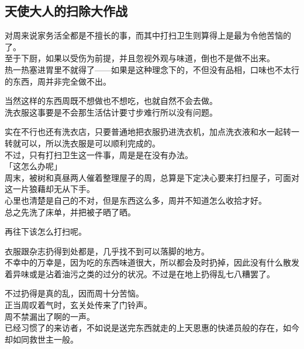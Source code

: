 \subsection{天使大人的扫除大作战}

对周来说家务活全都是不擅长的事，而其中打扫卫生则算得上是最为令他苦恼的了。\\

至于下厨，如果以受伤为前提，并且忽视外观与味道，倒也不是做不出来。\\

热一热塞进胃里不就得了——如果是这种理念下的，不但没有品相，口味也不太行的东西，周并非完全做不出。

当然这样的东西周既不想做也不想吃，也就自然不会去做。\\

洗衣服这事要是不会那生活估计要寸步难行所以没有问题。

实在不行也还有洗衣店，只要普通地把衣服扔进洗衣机，加点洗衣液和水一起转一转就可以，所以洗衣服是可以顺利完成的。\\

不过，只有打扫卫生这一件事，周是是在没有办法。\\

「这怎么办呢」\\

周末，被树和真昼两人催着整理屋子的周，总算是下定决心要来打扫屋子，可面对这一片狼藉却无从下手。\\

心里也清楚是自己的不对，但是东西这么多，周并不知道怎么收拾才好。\\

总之先洗了床单，并把被子晒了晒。

再往下该怎么打扫呢。

衣服跟杂志扔得到处都是，几乎找不到可以落脚的地方。\\

不幸中的万幸是，因为吃的东西味道很大，所以都会及时扔掉，因此没有什么散发着异味或是沾着油污之类的过分的状况。不过是在地上扔得乱七八糟罢了。

不过扔得是真的乱，因而周十分苦恼。\\

正当周叹着气时，玄关处传来了门铃声。\\

周不禁漏出了啊的一声。\\

已经习惯了的来访者，不如说是送完东西就走的上天恩惠的快递员般的存在，如今却如同救世主一般。\\

